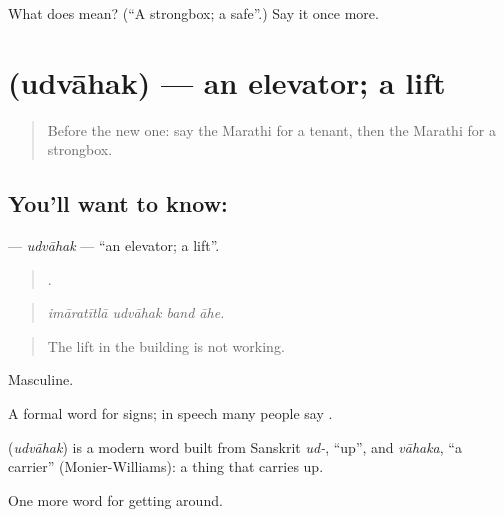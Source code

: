 \begin{tcolorbox}[breakable,colback=teal!4,colframe=teal!35!black,title={Before you move on}]
What does  mean? (\textquotedblleft{}A strongbox; a safe\textquotedblright{}.) Say it once more.
\end{tcolorbox}
\section[\texorpdfstring{\mr{उद्वाहक} (udvāhak)}{उद्वाहक (udvāhak)}]{ (udvāhak) — an elevator; a lift}

\label{lesson:MR-C417-udvahak}



\begin{quote}
Before the new one: say the Marathi for a tenant, then the Marathi for a strongbox.
\end{quote}

\subsection*{You'll want to know: }
\textbf{} — \emph{udvāhak} — \textquotedblleft{}an elevator; a lift\textquotedblright{}.

\begin{quote}
   .
\end{quote}

\begin{quote}
\emph{imāratītlā udvāhak band āhe.}
\end{quote}

\begin{quote}
The lift in the building is not working.
\end{quote}

Masculine.

A formal word for signs; in speech many people say .

\begin{cousinweb}
\textbf{} (\emph{udvāhak}) is a modern word built from Sanskrit \emph{ud-}, \textquotedblleft{}up\textquotedblright{}, and \emph{vāhaka}, \textquotedblleft{}a carrier\textquotedblright{} (Monier-Williams): a thing that carries up.
\end{cousinweb}

\begin{grammarlens}[title={What you've built}]
One more word for getting around.
\end{grammarlens}


